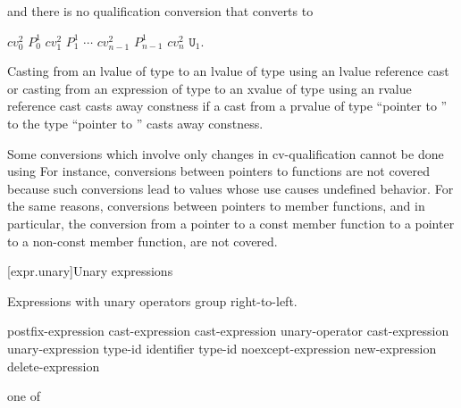 and there is no qualification conversion that converts  to

\begin{indented}
$cv_0^2$ $P_0^1$ $cv_1^2$ $P_1^1$ $\cdots$ $cv_{n-1}^2$ $P_{n-1}^1$ $cv_n^2$ $\mathtt{U}_1$.
\end{indented}

\pnum
Casting from an lvalue of type  to an lvalue of type
 using an lvalue reference cast
or casting from an expression of type  to an xvalue of type  using
an rvalue reference cast
casts away constness if a cast from a prvalue of type ``pointer to '' to the type ``pointer to
'' casts away constness.

\pnum
\begin{note}
Some conversions which involve only changes in cv-qualification cannot
be done using  For instance, conversions between
pointers to functions are not covered because such conversions lead to
values whose use causes undefined behavior. For the same reasons,
conversions between pointers to member functions, and in particular, the
conversion from a pointer to a const member function to a pointer to a
non-const member function, are not covered.
\end{note}%

[expr.unary]{Unary expressions}

\pnum
{}%
Expressions with unary operators group right-to-left.

%
%
%
%
%
\begin{bnf}
\br
    postfix-expression\br
    \terminal{++} cast-expression\br
    \terminal{-{-}} cast-expression\br
    unary-operator cast-expression\br
     unary-expression\br
     type-id \terminal{)}\br
     \terminal{(} identifier \terminal{)}\br
     type-id \terminal{)}\br
    noexcept-expression\br
    new-expression\br
    delete-expression
\end{bnf}

%
%
%
%
%
%
%
%
%
%
%
%
%
%
%
\begin{bnf}
 \textnormal{one of}\br
    \terminal{*  \&  +  -  !  \tilde}
\end{bnf}

